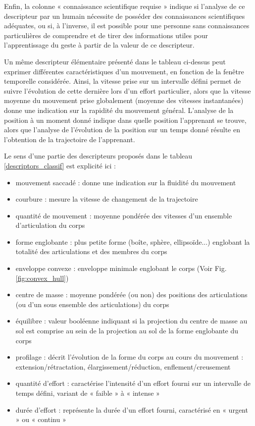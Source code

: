 Enfin, la colonne « connaissance scientifique requise » indique si l'analyse de ce descripteur par un humain nécessite de posséder des connaissances scientifiques adéquates, ou si, à l'inverse, il est possible pour une personne sans connaissances particulières de comprendre et de tirer des informations utiles pour l'apprentissage du geste à partir de la valeur de ce descripteur.

Un même descripteur élémentaire présenté dans le tableau ci-dessus peut exprimer différentes caractéristiques d'un mouvement, en fonction de la fenêtre temporelle considérée. Ainsi, la vitesse prise sur un intervalle défini permet de suivre l'évolution de cette dernière lors d'un effort particulier, alors que la vitesse moyenne du mouvement prise globalement (moyenne des vitesses instantanées) donne une indication sur la rapidité du mouvement général. L'analyse de la position à un moment donné indique dans quelle position l'apprenant se trouve, alors que l'analyse de l'évolution de la position sur un temps donné résulte en l'obtention de la trajectoire de l'apprenant.

Le sens d'une partie des descripteurs proposés dans le tableau \ref{descriptors_classif} est explicité ici :

\begin{itemize}
	\item mouvement saccadé : donne une indication sur la fluidité du mouvement
	\item courbure : mesure la vitesse de changement de la trajectoire
	\item quantité de mouvement : moyenne pondérée des vitesses d'un ensemble d'articulation du corps
	\item forme englobante : plus petite forme (boîte, sphère, ellipsoïde...) englobant la totalité des articulations et des membres du corps
	\item enveloppe convexe : enveloppe minimale englobant le corps (Voir Fig. \ref{fig:convex_hull})
	\item centre de masse : moyenne pondérée (ou non) des positions des articulations (ou d'un sous ensemble des articulations) du corps
	\item équilibre : valeur booléenne indiquant si la projection du centre de masse au sol est comprise au sein de la projection au sol de la forme englobante du corps
	\item profilage : décrit l'évolution de la forme du corps au cours du mouvement : extension/rétractation, élargissement/réduction, enflement/creusement
	\item quantité d'effort : caractérise l'intensité d'un effort fourni sur un intervalle de temps défini, variant de « faible » à « intense »
	\item durée d'effort : représente la durée d'un effort fourni, caractérisé en « urgent » ou « continu »
\end{itemize}

